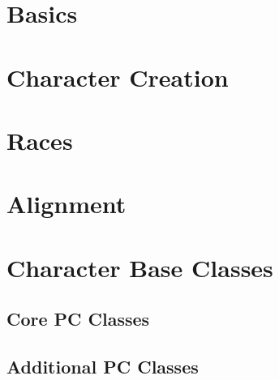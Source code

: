 \documentclass[10pt]{report}
\newcommand{\normalsections}{
\sectionfont{\noindent\rule{\textwidth}{0.015in}\\\nohang}
\subsectionfont{\noindent\rule{\textwidth}{0.005in}\\\nohang}
}
\newcommand{\itemspace}{\setlength{\itemsep}{-1mm}\setlength{\topsep}{-1mm} }
\begin{document}





\pagestyle{fancy}
\linespread{.9}  \small  \normalsize \itemspace \normalsections

\tableofcontents

\chapter{Basics}


\chapter{Character Creation}


\chapter{Races}


\chapter{Alignment}




\chapter{Character Base Classes}

\section{Core PC Classes}


%






%






\section{Additional PC Classes}
\end{document}
